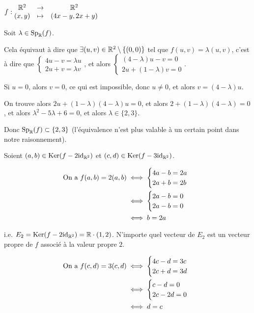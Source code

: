 \documentclass[12pt, a4paper]{report}
\begin{document}
\begin{example}
    \begin{outline}
        $f : \begin{matrix}
        \mathbb{R}^2 &\to &\mathbb{R}^2\\
        (x,y) &\mapsto &(4x-y, 2x+y)
        \end{matrix}$

        \1 Soit $\lambda \in \mathrm{Sp}_{\mathbb{R}}(f)$.
        
        \1 Cela équivaut à dire que $\exists (u,v) \in \mathbb{R}^2 \setminus \{(0,0)\}$ tel que $f(u,v) = \lambda (u,v)$, c'est à dire que $\begin{cases}4u - v = \lambda u\\ 2u + v = \lambda v\end{cases}$, et alors $\begin{cases} (4-\lambda)u - v = 0\\ 2u + (1-\lambda)v = 0\end{cases}$.

        \1 Si $u = 0$, alors $v = 0$, ce qui est impossible, donc $u \neq 0$, et alors $v = (4-\lambda)u$.

        \1 On trouve alors $2u + (1-\lambda)(4-\lambda)u = 0$, et alors $2 + (1-\lambda)(4-\lambda) = 0$, et alors $\lambda^2 - 5\lambda + 6 = 0$, et alors $\lambda \in \{2,3\}$.

        \1 Donc $\mathrm{Sp}_{\mathbb{R}}(f) \subset \{2,3\}$ (l'équivalence n'est plus valable à un certain point dans notre raisonnement).

        \1 Soient $(a,b) \in \mathrm{Ker}(f - 2\mathrm{id}_{\mathbb{R}^2})$ et $(c,d) \in \mathrm{Ker}(f - 3\mathrm{id}_{\mathbb{R}^2})$.

        \begin{align*}
            \text{ On a } f(a,b) = 2(a,b) &\iff \begin{cases}4a - b = 2a\\ 2a + b = 2b\end{cases}\\
            &\iff \begin{cases} 2a - b = 0\\ 2a - b = 0\end{cases}\\
            &\iff b = 2a
        \end{align*}

        \1 i.e. $E_2 = \mathrm{Ker}(f - 2\mathrm{id}_{\mathbb{R}^2}) = \mathbb{R}\cdot(1,2)$. N'importe quel vecteur de $E_2$ est un vecteur propre de $f$ associé à la valeur propre $2$.

        \begin{align*}
            \text{ On a } f(c,d) = 3(c,d) &\iff \begin{cases}4c - d = 3c\\ 2c + d = 3d\end{cases}\\
            &\iff \begin{cases} c - d = 0\\ 2c - 2d = 0\end{cases}\\
            &\iff d = c
        \end{align*}


\end{outline}
\end{example}
\end{document}
